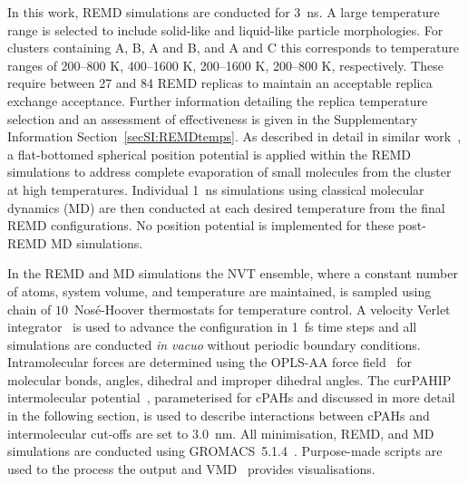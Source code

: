 In this work, REMD simulations are conducted for 3~ns. A large temperature range is selected to include solid-like and liquid-like particle morphologies. For clusters containing A, B, A and B, and A and C this corresponds to temperature ranges of 200--800 K, 400--1600 K, 200--1600 K, 200--800 K, respectively. These require between 27 and 84 REMD replicas to maintain an acceptable replica exchange acceptance. Further information detailing the replica temperature selection and an assessment of effectiveness is given in the Supplementary Information Section~\ref{secSI:REMDtemps}. As described in detail in similar work~\cite{bowal2018partitioning}, a flat-bottomed spherical position potential is applied within the REMD simulations to address complete evaporation of small molecules from the cluster at high temperatures. Individual 1~ns simulations using classical molecular dynamics (MD) are then conducted at each desired temperature from the final REMD configurations. No position potential is implemented for these post-REMD MD simulations.

In the REMD and MD simulations the NVT ensemble, where a constant number of atoms, system volume, and temperature are maintained, is sampled using chain of $10$~Nos\'{e}-Hoover thermostats for temperature control. A velocity Verlet integrator~\cite{Verlet_1967} is used to advance the configuration in 1~fs time steps and all simulations are conducted \textit{in vacuo} without periodic boundary conditions.  Intramolecular forces are determined using the OPLS-AA force field~\cite{Kaminski2001opls} for molecular bonds, angles, dihedral and improper dihedral angles. The curPAHIP intermolecular potential~\cite{bowal2019ion}, parameterised for cPAHs and discussed in more detail in the following section, is used to describe interactions between cPAHs and intermolecular cut-offs are set to $3.0$~nm. All minimisation, REMD, and MD simulations are conducted using GROMACS~5.1.4~\cite{Abraham2015}. Purpose-made scripts are used to the process the output and VMD~\cite{Humphrey1996} provides visualisations.


